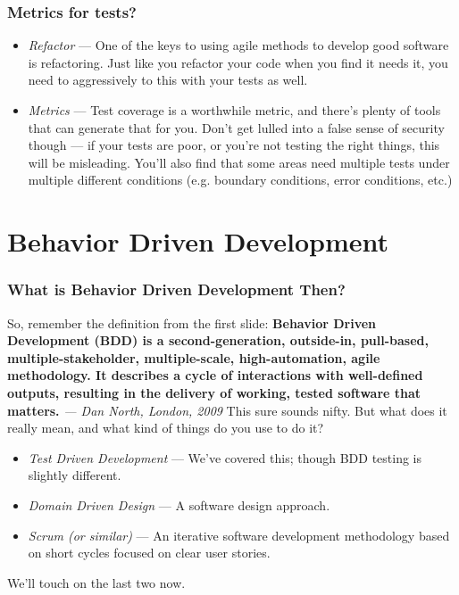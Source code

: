 \documentclass[t, 10pt]{beamer}
\begin{document}
\begin{frame}
\frametitle{Metrics for tests?}
\begin{itemize}
\item \textit{Refactor} --- One of the keys to using agile methods to develop good software is refactoring.  Just like you refactor your code when you find it needs it, you need to aggressively to this with your tests as well.
\item \textit{Metrics} --- Test coverage is a worthwhile metric, and there's plenty of tools that can generate that for you.  Don't get lulled into a false sense of security though --- if your tests are poor, or you're not testing the right things, this will be misleading.  You'll also find that some areas need multiple tests under multiple different conditions (e.g. boundary conditions, error conditions, etc.)
\end{itemize}
\end{frame}

\section{Behavior Driven Development}

\begin{frame}
\frametitle{What is Behavior Driven Development Then?}
So, remember the definition from the first slide:
\textbf{Behavior Driven Development (BDD) is a second-generation, outside-in, pull-based, multiple-stakeholder, multiple-scale, high-automation, agile methodology. It describes a cycle of interactions with well-defined outputs, resulting in the delivery of working, tested software that matters.}
\newline
\textit{--- Dan North, London, 2009}
\newline
\newline
This sure sounds nifty.  But what does it really mean, and what kind of things do you use to do it?
\begin{itemize}
\item \textit{Test Driven Development} --- We've covered this; though BDD testing is slightly different.
\item \textit{Domain Driven Design} --- A software design approach.
\item \textit{Scrum (or similar)} --- An iterative software development methodology based on short cycles focused on clear user stories.
\end{itemize}
We'll touch on the last two now.
\end{frame}
\end{document}
